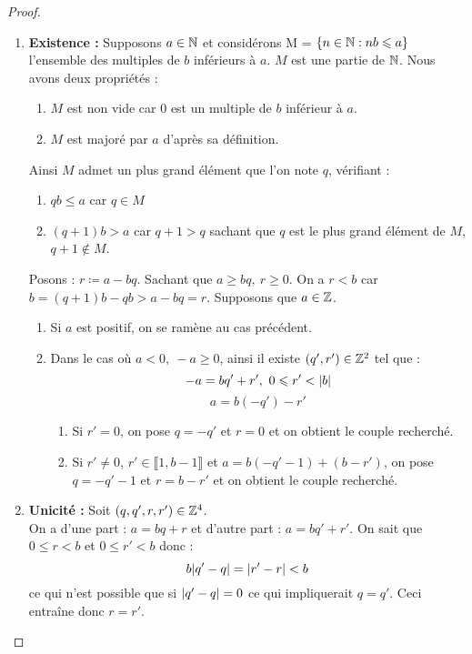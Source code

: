\begin{proof}\cite{livre_prepa}
	\leavevmode
	\begin{enumerate}
		\item \textbf{Existence :} Supposons $a \in \mathbb{N}$ et considérons M = $\{n \in \mathbb{N} : nb \leqslant a\}$ l'ensemble des multiples de $b$ inférieurs à $a$. $M$ est une partie de $\mathbb{N}$. Nous avons deux propriétés : 
		\begin{enumerate}
			\item $M$ est non vide car 0 est un multiple de $b$ inférieur à $a$.
			\item $M$ est majoré par $a$ d'après sa définition.
		\end{enumerate}
		Ainsi $M$ admet un plus grand élément que l'on note $q$, vérifiant :
		\begin{enumerate}
			\item $qb \leq a$ car $q \in M$ 
			\item $(q + 1)b > a$ car $q + 1 > q$ sachant que $q$ est le plus grand élément de $M$, $q + 1 \notin M$.
		\end{enumerate}
		Posons : $r \coloneqq a - bq$. Sachant que $a \geq bq,\ r \geq 0$. On a $r < b$ car $b = (q + 1)b - qb > a - bq = r$. Supposons que $a \in \mathbb{Z}$. 
		\begin{enumerate}
			\item Si $a$ est positif, on se ramène au cas précédent.
			\item Dans le cas où $a < 0,\ -a \geq 0$, ainsi il existe $(q', r') \in \mathbb{Z}^2$ tel que :
		\[ -a = bq' + r',\ 0 \leqslant r' < \abs{b} \]
		\[a = b(-q') - r' \]
			\begin{enumerate}
				\item Si $r' = 0$, on pose $q = -q'$ et $r = 0$ et on obtient le couple recherché.
				\item Si $r' \neq 0$, $r' \in \llbracket 1, b-1 \rrbracket$ et $a = b(-q' -1) + (b - r')$, on pose $q = -q' - 1$ et $r = b - r'$ et on obtient le couple recherché. 
			\end{enumerate}
		\end{enumerate}
		\item \textbf{Unicité :} Soit $(q, q', r, r') \in \mathbb{Z}^4$. \\
	On a d'une part : $a = bq + r$ et d'autre part : $a = bq' + r'$.
	On sait que $0 \leq r < b$ et $0 \leq r' < b$ donc :
	\[ b \abs{q' - q} = \abs{r' - r} < b \]
	ce qui n'est possible que si $\abs{q' - q} = 0$ ce qui impliquerait $q = q'$. Ceci entraîne donc $r = r'$.
	\end{enumerate}
\end{proof}

